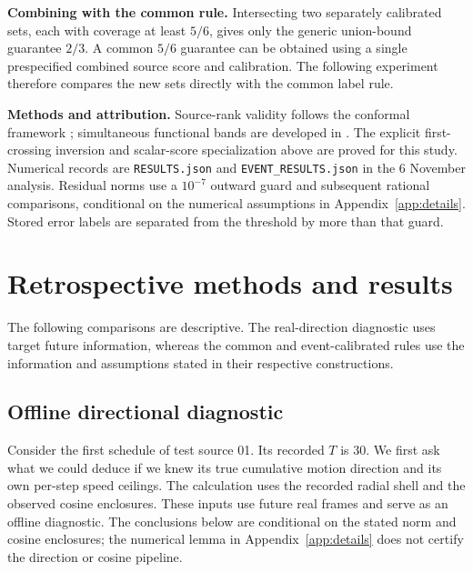 \documentclass[11pt]{article}
\theoremstyle{noteplain}
\begin{document}
\textbf{Combining with the common rule.}
Intersecting two separately calibrated sets, each with coverage at least $5/6$, gives only the generic union-bound guarantee $2/3$. A common $5/6$ guarantee can be obtained using a single prespecified combined source score and calibration. The following experiment therefore compares the new sets directly with the common label rule.

\vspace{2pt}
{\footnotesize\textbf{Methods and attribution.}
Source-rank validity follows the conformal framework \cite{vovk2005}; simultaneous functional bands are developed in \cite[Sections 2--3.1]{diquigiovanni2021}. The explicit first-crossing inversion and scalar-score specialization above are proved for this study. Numerical records are \texttt{RESULTS.json} and \texttt{EVENT\_RESULTS.json} in the 6 November analysis. Residual norms use a $10^{-7}$ outward guard and subsequent rational comparisons, conditional on the numerical assumptions in Appendix~\ref{app:details}. Stored error labels are separated from the threshold by more than that guard.}


\section{Retrospective methods and results}\label{sec:replay}
The following comparisons are descriptive. The real-direction diagnostic uses target future information, whereas the common and event-calibrated rules use the information and assumptions stated in their respective constructions.

\subsection{Offline directional diagnostic}
Consider the first schedule of test source 01. Its recorded $T$ is 30. We first ask what we could deduce if we knew its true cumulative motion direction and its own per-step speed ceilings. The calculation uses the recorded radial shell and the observed cosine enclosures. These inputs use future real frames and serve as an offline diagnostic. The conclusions below are conditional on the stated norm and cosine enclosures; the numerical lemma in Appendix~\ref{app:details} does not certify the direction or cosine pipeline.
\end{document}
